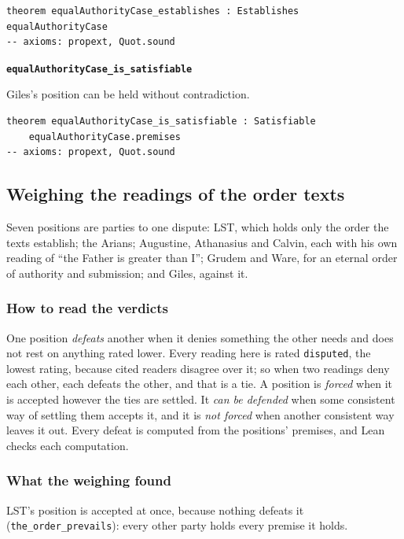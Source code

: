 \documentclass[11pt,paper=\testimonypaper,DIV=13,parskip=false]{scrartcl}
\begin{document}
{\small\begin{verbatim}
theorem equalAuthorityCase_establishes : Establishes equalAuthorityCase
-- axioms: propext, Quot.sound
\end{verbatim}}
\par\medskip\noindent\textbf{\texttt{equal\allowbreak{}Authority\allowbreak{}Case\_\allowbreak{}is\_\allowbreak{}satisfiable}}\par\nobreak\noindent
Giles’s position can be held without contradiction.

{\small\begin{verbatim}
theorem equalAuthorityCase_is_satisfiable : Satisfiable
    equalAuthorityCase.premises
-- axioms: propext, Quot.sound
\end{verbatim}}
\subsection*{Weighing the readings of the order texts}
Seven positions are parties to one dispute: LST, which holds only the order the texts establish; the Arians; Augustine, Athanasius and Calvin, each with his own reading of “the Father is greater than I”; Grudem and Ware, for an eternal order of authority and submission; and Giles, against it.

\subsubsection*{How to read the verdicts}
One position \emph{defeats} another when it denies something the other needs and does not rest on anything rated lower. Every reading here is rated \texttt{disputed}, the lowest rating, because cited readers disagree over it; so when two readings deny each other, each defeats the other, and that is a tie. A position is \emph{forced} when it is accepted however the ties are settled. It \emph{can be defended} when some consistent way of settling them accepts it, and it is \emph{not forced} when another consistent way leaves it out. Every defeat is computed from the positions’ premises, and Lean checks each computation.

\subsubsection*{What the weighing found}
LST’s position is accepted at once, because nothing defeats it (\texttt{the\_\allowbreak{}order\_\allowbreak{}prevails}): every other party holds every premise it holds.
\end{document}
